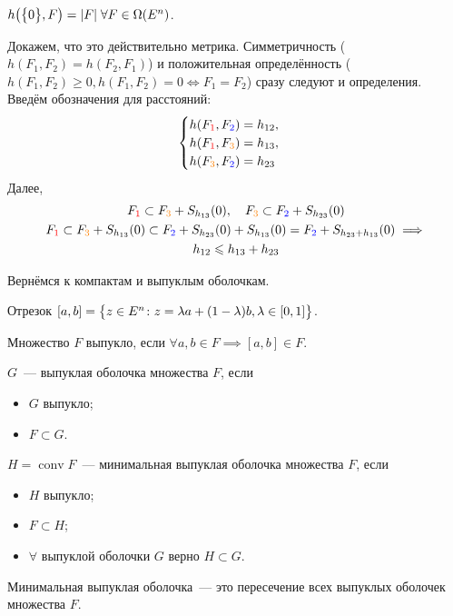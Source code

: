 \begin{exmp}
    $h\bigl(\bigl\{ 0 \bigr\}, F\bigr) = |F| \; \forall F \in \Omega(E^n)$.
\end{exmp}

Докажем, что это действительно метрика.
Симметричность ($h(F_1, F_2) = h(F_2, F_1)$) и положительная определённость ($h(F_1, F_2) \geqslant 0, h(F_1, F_2) = 0 \iff F_1 = F_2$) сразу следуют и определения.
Введём обозначения для расстояний:
\begin{equation*}
    \begin{cases}
        h(F_{\color{red} 1}, F_{\color{blue} 2}) = h_{12}, \\
        h(F_{\color{red} 1}, F_{\color{orange} 3}) = h_{13}, \\
        h(F_{\color{orange} 3}, F_{\color{blue} 2}) = h_{23}
    \end{cases}
\end{equation*}
Далее, 
\begin{gather*}
    F_{\color{red} 1} \subset F_{\color{orange} 3} + S_{h_{13}}(0), \quad F_{\color{orange} 3} \subset F_{\color{blue} 2} + S_{h_{23}}(0) \\
    F_{\color{red} 1} \subset F_{\color{orange} 3} + S_{h_{13}}(0) \subset F_{\color{blue} 2} + S_{h_{23}}(0) + S_{h_{13}}(0) = F_{\color{blue} 2} + S_{h_{23} + h_{13}}(0) \implies \\
    h_{12} \leqslant h_{13} + h_{23}
\end{gather*}

Вернёмся к компактам и выпуклым оболочкам.
\begin{defn}
    Отрезок $[a, b] = \bigl\{ z \in E^{n}\colon z = \lambda a + (1 - \lambda)b, \lambda \in [0, 1] \bigr\}$.
\end{defn}
\begin{defn}
    Множество $F$ выпукло, если $\forall a, b \in F \implies [a,b] \in F$.
\end{defn}
\begin{defn}
    $G$~--- выпуклая оболочка множества $F$, если
    \begin{itemize}
        \item $G$ выпукло;
        \item $F \subset G$.
    \end{itemize}
\end{defn}
\begin{defn}
    $H = \operatorname{conv} F$~--- минимальная выпуклая оболочка множества $F$, если
    \begin{itemize}
        \item $H$ выпукло;
        \item $F \subset H$;
        \item $\forall$ выпуклой оболочки $G$ верно $H \subset G$.
    \end{itemize}
\end{defn}
\begin{rmrk}
    Минимальная выпуклая оболочка~--- это пересечение всех выпуклых оболочек множества $F$.
\end{rmrk}


